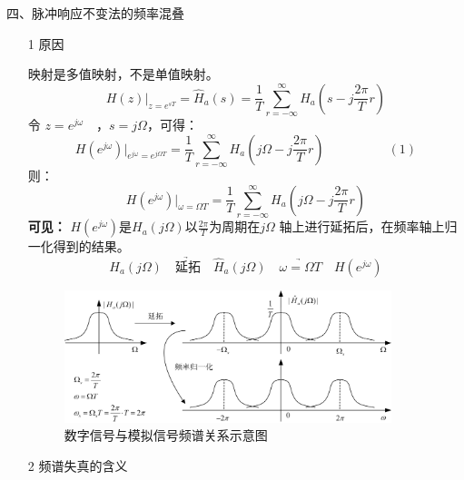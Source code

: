 \documentclass[notheorems,compress,mathserif,table]{beamer}
\begin{document}
\begin{frame}[allowframebreaks]\frametitle{}%
四、脉冲响应不变法的频率混叠
\begin{enumerate}
  \item [1] 原因

       映射是多值映射，不是单值映射。
        $$
        H(z)|_{z=e^{sT}}= \hat{H}_a(s)  = \frac{1}{T}\sum_{r=-\infty}^{\infty}H_a(s-j\frac{2\pi}{T}r)
        $$
        令 $z=e^{j\omega}\quad$，$s=j\Omega$，可得：
        $$
        H(e^{j\omega})|_{e^{j\omega}=e^{j\Omega T}}%
        =  \frac{1}{T}\sum_{r=-\infty}^{\infty}H_a(j\Omega-j\frac{2\pi}{T}r)
        \quad\quad\quad\quad\quad(1)$$
%
        则：
        $$
         H(e^{j\omega})|_{\omega=\Omega T}
            =  \frac{1}{T}\sum_{r=-\infty}^{\infty}H_a(j\Omega-j\frac{2\pi}{T}r)
        $$
        \textbf{可见：}
        $H(e^{j\omega})$是$H_a(j\Omega)$以$\frac{2\pi}{T}$为周期在$j\Omega$
        轴上进行延拓后，在频率轴上归一化得到的结果。
        $$H_a(j\Omega)\underrightarrow{\quad\mbox{延拓}\quad}
        \hat{H}_a(j\Omega)\underrightarrow{\quad \omega=\Omega T\quad} H(e^{j\omega})$$


        \begin{figure}[h]
           \centering
           \includegraphics[width=0.9\textwidth]{fig16_MZpinlvhundie.jpg}
           \caption{数字信号与模拟信号频谱关系示意图}
        \end{figure}
  \newpage
  \item [2] 频谱失真的含义


\end{enumerate}
\end{frame}
\end{document}
